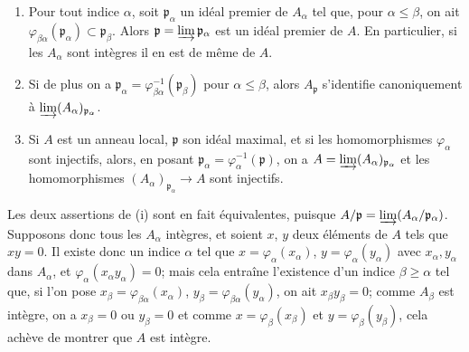 \begin{proposition}[5.13.3]
\label{IV.2.s5.13.3-fr}
\begin{enumerate}
\item[\textup{(i)}] Pour tout indice $\alpha$, soit $\mathfrak p_\alpha$ un idéal
premier de $A_\alpha$ tel que, pour $\alpha\leq\beta$, on ait
$\varphi_{\beta\alpha}(\mathfrak p_\alpha)\subset\mathfrak p_\beta$. Alors
$\mathfrak p=\varinjlim\mathfrak p_\alpha$ est un idéal premier de $A$. En
particulier, si les $A_\alpha$ sont intègres il en est de même de $A$.
\item[\textup{(ii)}] Si de plus on a
$\mathfrak p_\alpha=\varphi_{\beta\alpha}^{-1}(\mathfrak p_\beta)$ pour
$\alpha\leq\beta$, alors $A_{\mathfrak p}$ s'identifie canoniquement à
$\varinjlim(A_\alpha)_{\mathfrak p_\alpha}$.
\item[\textup{(iii)}] Si $A$ est un anneau local, $\mathfrak p$ son idéal maximal, et
si les homomorphismes $\varphi_\alpha$ sont injectifs, alors, en posant
$\mathfrak p_\alpha=\varphi_\alpha^{-1}(\mathfrak p)$, on a
$A=\varinjlim(A_\alpha)_{\mathfrak p_\alpha}$ et les homomorphismes
$(A_\alpha)_{\mathfrak p_\alpha}\to A$ sont injectifs.
\end{enumerate}
\end{proposition}

Les deux assertions de (i) sont en fait équivalentes, puisque
$A/\mathfrak p=\varinjlim(A_\alpha/\mathfrak p_\alpha)$. Supposons donc tous
les $A_\alpha$ intègres, et soient $x$, $y$ deux éléments de $A$ tels que
$xy=0$. Il existe donc un indice $\alpha$ tel que
$x=\varphi_\alpha(x_\alpha)$, $y=\varphi_\alpha(y_\alpha)$ avec
$x_\alpha,y_\alpha$ dans $A_\alpha$, et
$\varphi_\alpha(x_\alpha y_\alpha)=0$; mais cela entraîne l'existence d'un
indice $\beta\geq\alpha$ tel que, si l'on pose
$x_\beta=\varphi_{\beta\alpha}(x_\alpha)$,
$y_\beta=\varphi_{\beta\alpha}(y_\alpha)$, on ait $x_\beta y_\beta=0$; comme
$A_\beta$ est intègre, on a $x_\beta=0$ ou $y_\beta=0$ et comme
$x=\varphi_\beta(x_\beta)$ et $y=\varphi_\beta(y_\beta)$, cela achève de
montrer que $A$ est intègre.

